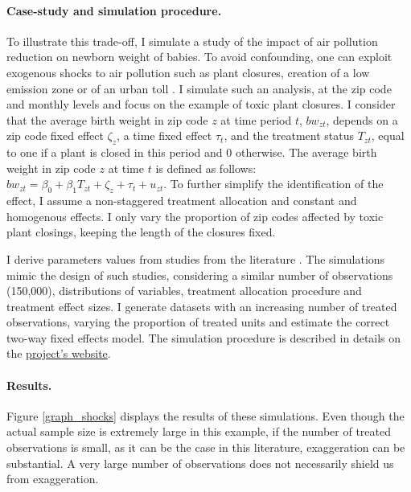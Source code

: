 \documentclass[usletter, 12pt]{article}
\begin{document}
			\paragraph{Case-study and simulation procedure.} %
			To illustrate this trade-off, I simulate a study of the impact of air pollution reduction on newborn weight of babies. To avoid confounding, one can exploit exogenous shocks to air pollution such as plant closures, creation of a low emission zone or of an urban toll \citep{currie_environmental_2015, lavaine_energy_2017}. I simulate such an analysis, at the zip code and monthly levels and focus on the example of toxic plant closures. I consider that the average birth weight in zip code $z$ at time period $t$, $bw_{zt}$, depends on a zip code fixed effect $\zeta_z$, a time fixed effect $\tau_t$, and the treatment status $T_{zt}$, equal to one if a plant is closed in this period and 0 otherwise. The average birth weight in zip code $z$ at time $t$ is defined as follows: $bw_{zt} = \beta_0 + \beta_1 T_{zt} + \zeta_z + \tau_t + u_{zt}$. To further simplify the identification of the effect, I assume a non-staggered treatment allocation and constant and homogenous effects. I only vary the proportion of zip codes affected by toxic plant closings, keeping the length of the closures fixed.

       I derive parameters values from studies from the literature \citep{currie_environmental_2015, lavaine_energy_2017}. The simulations mimic the design of such studies, considering a similar number of observations (150,000), distributions of variables, treatment allocation procedure and treatment effect sizes. I generate datasets with an increasing number of treated observations, varying the proportion of treated units and estimate the correct two-way fixed effects model. The simulation procedure is described in details on the \href{https://vincentbagilet.github.io/causal_exaggeration/shocks.html}{project's website}.
        
			\paragraph{Results.} Figure \ref{graph_shocks} displays the results of these simulations. Even though the actual sample size is extremely large in this example, if the number of treated observations is small, as it can be the case in this literature, exaggeration can be substantial. A very large number of observations does not necessarily shield us from exaggeration. 
\end{document}
